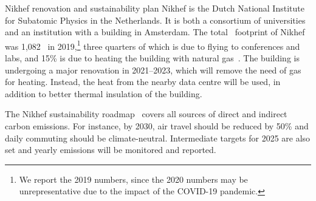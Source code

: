 \documentclass[../SustainableHEP.tex]{subfiles}
\begin{document}

\begin{bestpractice}{Nikhef renovation and sustainability plan}%
    Nikhef is the Dutch National Institute for Subatomic Physics in the Netherlands. It is both a consortium of universities and an institution with a building in Amsterdam. The total \CdO\ footprint of Nikhef was 1,082 \tCdOe\ in 2019,\footnote{We report the 2019 numbers, since the 2020 numbers may be unrepresentative due to the impact of the COVID-19 pandemic.} three quarters of which is due to flying to conferences and labs, and 15\% is due to heating the building with natural gas~\cite{Nikhef}. The building is undergoing a major renovation in 2021--2023, which will remove the need of gas for heating. Instead, the heat from the nearby data centre will be used, in addition to better thermal insulation of the building.

    The Nikhef sustainability roadmap~\cite{Nikhef} covers all sources of direct and indirect carbon emissions. For instance, by 2030, air travel should be reduced by 50\% and daily commuting should be climate-neutral.  Intermediate targets for 2025 are also set and yearly emissions will be monitored and reported.
\end{bestpractice}



\pagebreak
\end{document}
